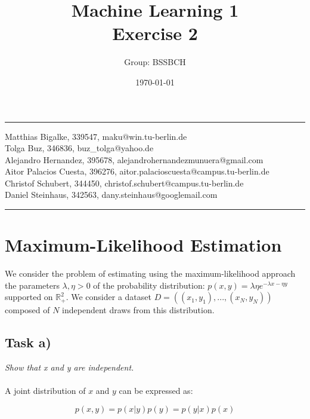 \documentclass{article}
\title{Machine Learning 1 \\ Exercise 2} %
\author{Group: BSSBCH} %
\date{\today} %
\begin{document}
\maketitle %
\noindent\rule[0.5ex]{\linewidth}{1pt}
Matthias Bigalke, 339547, maku@win.tu-berlin.de \\
Tolga Buz, 346836, buz\_tolga@yahoo.de \\
Alejandro Hernandez, 395678, alejandrohernandezmunuera@gmail.com \\
Aitor Palacios Cuesta, 396276, aitor.palacioscuesta@campus.tu-berlin.de \\
Christof Schubert, 344450, christof.schubert@campus.tu-berlin.de \\
Daniel Steinhaus, 342563, dany.steinhaus@googlemail.com\\
\noindent\rule[0.5ex]{\linewidth}{1pt}


\section{Maximum-Likelihood Estimation}

We consider the problem of estimating using the maximum-likelihood approach the parameters $\lambda, \eta > 0$ of the probability
distribution: $p(x, y) = \lambda\eta e ^ {- \lambda x - \eta y}$ supported on $\mathbb{R}^2_+$. We consider a dataset $D = ((x_1, y_1), . . . ,(x_N , y_N ))$ composed of $N$ independent draws from this
distribution.

\subsection{Task a)}

\textit{Show that x and y are independent.}\\
\\
A joint distribution of $x$ and $y$ can be expressed as:

\begin{equation}
p(x,y) = p(x|y)p(y) = p(y|x)p(x) 
\end{equation}
\end{document}
